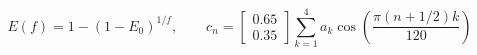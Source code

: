 \documentclass{article}
\begin{document}
\fontsize{22}{29}\selectfont
\[
E(f)=1-(1-E_0)^{1/f},\qquad c_n=\begin{bmatrix}0.65\\0.35\end{bmatrix}\sum_{k=1}^{4}a_k\cos\!\left(\frac{\pi(n+1/2)k}{120}\right)
\]
\end{document}
